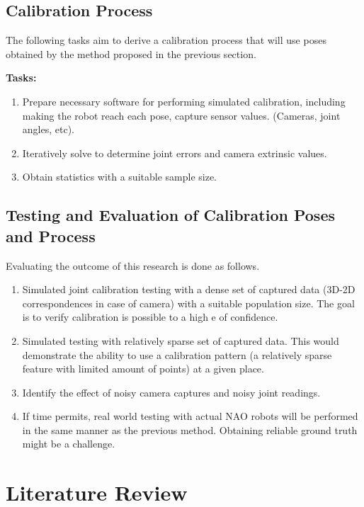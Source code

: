 \documentclass[english, printversion, nomenclature, notitle]{tuvisionthesis} %
\begin{document}
\section{Calibration Process}
The following tasks aim to derive a calibration process that will use poses obtained by the method proposed in the previous section.

\textbf{Tasks:}
\begin{enumerate}
	\item Prepare necessary software for performing simulated calibration, including making the robot reach each pose, capture sensor values. (Cameras, joint angles, etc).
	\item Iteratively solve to determine joint errors and camera extrinsic values.
	\item Obtain statistics with a suitable sample size.
\end{enumerate}

\section{Testing and Evaluation of Calibration Poses and Process}
Evaluating the outcome of this research is done as follows.

\begin{enumerate}
	\item Simulated joint calibration testing with a dense set of captured data (3D-2D correspondences in case of camera) with a suitable population size.
	\subitem The goal is to verify calibration is possible to a high e of confidence.
	\item Simulated testing with relatively sparse set of captured data. This would demonstrate the ability to use a calibration pattern (a relatively sparse feature with limited amount of points) at a given place.
	\item Identify the effect of noisy camera captures and noisy joint readings.
	\item If time permits, real world testing with actual NAO robots will be performed in the same manner as the previous method. Obtaining reliable ground truth might be a challenge.
	
\end{enumerate}

\chapter{Literature Review}
\label{chap:literature}
\end{document}

